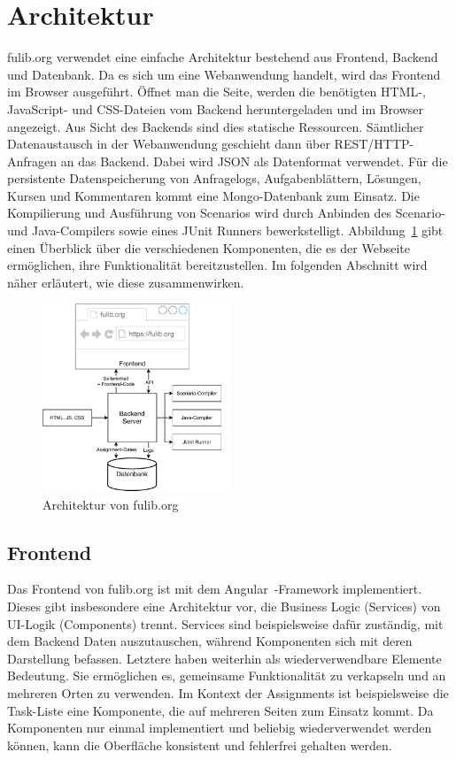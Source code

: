 \section{Architektur}\label{sec:architecture}

fulib.org verwendet eine einfache Architektur bestehend aus Frontend, Backend und Datenbank.
Da es sich um eine Webanwendung handelt, wird das Frontend im Browser ausgeführt.
Öffnet man die Seite, werden die benötigten HTML-, JavaScript- und CSS-Dateien vom Backend heruntergeladen und im Browser angezeigt.
Aus Sicht des Backends sind dies statische Ressourcen.
Sämtlicher Datenaustausch in der Webanwendung geschieht dann über REST/HTTP-Anfragen an das Backend.
Dabei wird JSON als Datenformat verwendet.
Für die persistente Datenspeicherung von Anfragelogs, Aufgabenblättern, Lösungen, Kursen und Kommentaren kommt eine Mongo\cite{mongodb}-Datenbank zum Einsatz.
Die Kompilierung und Ausführung von Scenarios wird durch Anbinden des Scenario- und Java-Compilers sowie eines JUnit Runners bewerkstelligt.
Abbildung~\ref{fig:website-architecture} gibt einen Überblick über die verschiedenen Komponenten,
die es der Webseite ermöglichen, ihre Funktionalität bereitzustellen.
Im folgenden Abschnitt wird näher erläutert, wie diese zusammenwirken.

\begin{figure}
    \centering
    \includegraphics[width=0.5\textwidth]{chapter/fulib.org/img/architecture.pdf}
    \caption{Architektur von fulib.org}
    \label{fig:website-architecture}
\end{figure}

\subsection{Frontend}\label{subsec:frontend}

Das Frontend von fulib.org ist mit dem Angular~\cite{angular}-Framework implementiert.
Dieses gibt insbesondere eine Architektur vor, die Business Logic (Services) von UI-Logik (Components) trennt.
Services sind beispielsweise dafür zuständig, mit dem Backend Daten auszutauschen,
während Komponenten sich mit deren Darstellung befassen.
Letztere haben weiterhin als wiederverwendbare Elemente Bedeutung.
Sie ermöglichen es, gemeinsame Funktionalität zu verkapseln und an mehreren Orten zu verwenden.
Im Kontext der Assignments ist beispielsweise die Task-Liste eine Komponente, die auf mehreren Seiten zum Einsatz kommt.
Da Komponenten nur einmal implementiert und beliebig wiederverwendet werden können,
kann die Oberfläche konsistent und fehlerfrei gehalten werden.

